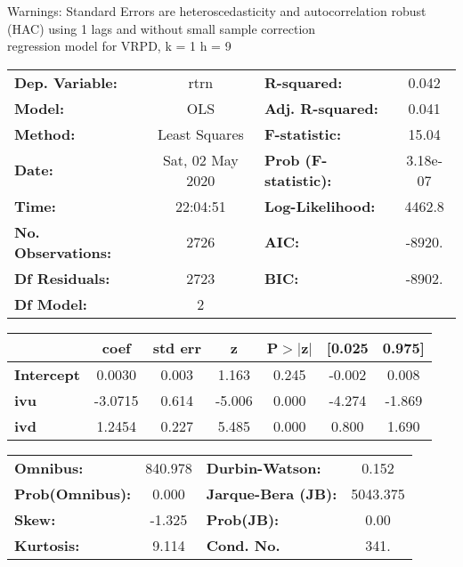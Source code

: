 Warnings: \newline
 [1] Standard Errors are heteroscedasticity and autocorrelation robust (HAC) using 1 lags and without small sample correction\\ 

regression model for VRPD, k = 1 h = 9\begin{center}
\begin{tabular}{lclc}
\toprule
\textbf{Dep. Variable:}    &       rtrn       & \textbf{  R-squared:         } &     0.042   \\
\textbf{Model:}            &       OLS        & \textbf{  Adj. R-squared:    } &     0.041   \\
\textbf{Method:}           &  Least Squares   & \textbf{  F-statistic:       } &     15.04   \\
\textbf{Date:}             & Sat, 02 May 2020 & \textbf{  Prob (F-statistic):} &  3.18e-07   \\
\textbf{Time:}             &     22:04:51     & \textbf{  Log-Likelihood:    } &    4462.8   \\
\textbf{No. Observations:} &        2726      & \textbf{  AIC:               } &    -8920.   \\
\textbf{Df Residuals:}     &        2723      & \textbf{  BIC:               } &    -8902.   \\
\textbf{Df Model:}         &           2      & \textbf{                     } &             \\
\bottomrule
\end{tabular}
\begin{tabular}{lcccccc}
                   & \textbf{coef} & \textbf{std err} & \textbf{z} & \textbf{P$> |$z$|$} & \textbf{[0.025} & \textbf{0.975]}  \\
\midrule
\textbf{Intercept} &       0.0030  &        0.003     &     1.163  &         0.245        &       -0.002    &        0.008     \\
\textbf{ivu}       &      -3.0715  &        0.614     &    -5.006  &         0.000        &       -4.274    &       -1.869     \\
\textbf{ivd}       &       1.2454  &        0.227     &     5.485  &         0.000        &        0.800    &        1.690     \\
\bottomrule
\end{tabular}
\begin{tabular}{lclc}
\textbf{Omnibus:}       & 840.978 & \textbf{  Durbin-Watson:     } &    0.152  \\
\textbf{Prob(Omnibus):} &   0.000 & \textbf{  Jarque-Bera (JB):  } & 5043.375  \\
\textbf{Skew:}          &  -1.325 & \textbf{  Prob(JB):          } &     0.00  \\
\textbf{Kurtosis:}      &   9.114 & \textbf{  Cond. No.          } &     341.  \\
\bottomrule
\end{tabular}
\end{center}


